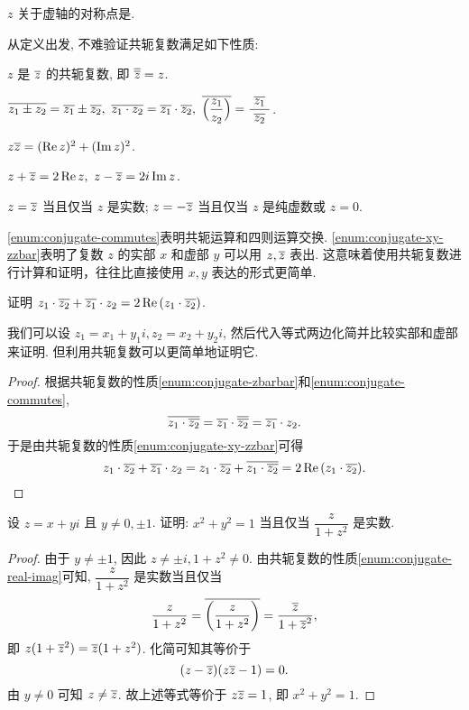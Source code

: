 \begin{exercise}
  $z$ 关于虚轴的对称点是\fillblank{}.
\end{exercise}

从定义出发, 不难验证共轭复数满足如下性质:
\begin{enumpar}
  \item $z$ 是 $\overline z$ 的共轭复数, 即 $\overline{\overline z}=z$.
  \label{enum:conjugate-zbarbar}
  \item $\ov{z_1\pm z_2}=\ov{z_1}\pm\ov{z_2},\ 
  \ov{z_1\cdot z_2}=\ov{z_1}\cdot\ov{z_2},\ 
  \ov{\Bigl(\dfrac{z_1}{z_2}\Bigr)}=\dfrac{~\ov{z_1}~}{~\ov{z_2}~}$.
  \label{enum:conjugate-commutes}
  \item $z\overline{z}=(\operatorname{Re} z)^2+(\operatorname{Im} z)^2$.
  \item $z+\overline z=2\operatorname{Re} z,\ z-\overline z=2i\operatorname{Im} z$.
  \label{enum:conjugate-xy-zzbar}
  \item $z=\overline z$ 当且仅当 $z$ 是实数; $z=-\overline z$ 当且仅当 $z$ 是纯虚数或 $z=0$.
  \label{enum:conjugate-real-imag}
\end{enumpar}\par\noindent
\ref{enum:conjugate-commutes}表明共轭运算和四则运算交换.
\ref{enum:conjugate-xy-zzbar}表明了复数 $z$ 的实部 $x$ 和虚部 $y$ 可以用 $z,\overline z$ 表出.
这意味着使用共轭复数进行计算和证明，往往比直接使用 $x,y$ 表达的形式更简单.

\begin{example}
  证明 $z_1\cdot\overline{z_2}+\overline{z_1}\cdot z_2=2\operatorname{Re}{(z_1\cdot\overline{z_2})}$.
\end{example}

我们可以设 $z_1=x_1+y_1i,z_2=x_2+y_2i$, 然后代入等式两边化简并比较实部和虚部来证明.
但利用共轭复数可以更简单地证明它.

\begin{proof}
  根据共轭复数的性质\ref{enum:conjugate-zbarbar}和\ref{enum:conjugate-commutes},
  \[\overline{z_1\cdot\overline{z_2}}=\overline{z_1}\cdot\overline{\overline{z_2}}=\overline{z_1}\cdot z_2.\]
  于是由共轭复数的性质\ref{enum:conjugate-xy-zzbar}可得
    \[z_1\cdot\overline{z_2}+\overline{z_1}\cdot z_2
      =z_1\cdot\overline{z_2}+\overline{z_1\cdot\overline{z_2}}
      =2\operatorname{Re}{(z_1\cdot\overline{z_2})}.\]
\end{proof}

\begin{example}
  设 $z=x+yi$ 且 $y\neq 0,\pm1$. 证明: $x^2+y^2=1$ 当且仅当 $\dfrac z{1+z^2}$ 是实数.
\end{example}
\begin{proof}
  由于 $y\neq\pm1$, 因此 $z\neq \pm i, 1+z^2\neq 0$.
  由共轭复数的性质\ref{enum:conjugate-real-imag}可知, 
  $\dfrac z{1+z^2}$ 是实数当且仅当
    \[\frac z{1+z^2}=\overline{\left(\frac z{1+z^2}\right)}=\frac{\overline z}{1+{\overline z}^2},\]
  即 $z(1+{\overline z}^2)=\overline z(1+z^2)$.
  化简可知其等价于
    \[(z-\overline z)(z\overline z-1)=0.\]
  由 $y\neq0$ 可知 $z\neq \overline z$.
  故上述等式等价于 $z\overline z=1$, 即 $x^2+y^2=1$.
\end{proof}

